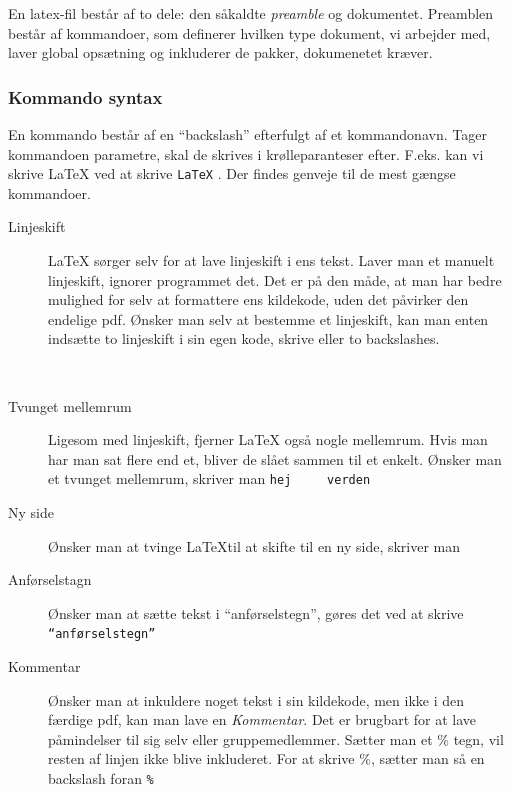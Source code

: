 \documentclass{article}
\newcommand{\tex}[1] {
  \texttt{#1}
}
\begin{document}
   En latex-fil består af to dele: den såkaldte \emph{preamble} og dokumentet.
   Preamblen består af kommandoer, som definerer hvilken type dokument, vi
   arbejder med, laver global opsætning og inkluderer de pakker, dokumenetet
   kræver.

   \subsubsection{Kommando syntax}
     En kommando består af en ``backslash'' efterfulgt af et kommandonavn.
     Tager kommandoen parametre, skal de skrives i krølleparanteser
     efter. F.eks. kan vi skrive \LaTeX{} ved at skrive \tex{\LaTeX}. Der findes
     genveje til de mest gængse kommandoer.
     \begin{description}
       \item[Linjeskift] \LaTeX{} sørger selv for at lave linjeskift i ens tekst.
         Laver man et manuelt linjeskift, ignorer programmet det. Det er på den måde, at man har
         bedre mulighed for selv at formattere ens kildekode, uden det påvirker den
         endelige pdf. Ønsker man selv at bestemme et linjeskift, kan man enten indsætte to
         linjeskift i sin egen kode, skrive \tex{\linebreak} eller to backslashes.
         \tex{\\}

       \item[Tvunget mellemrum] Ligesom med linjeskift, fjerner \LaTeX{} også
         nogle mellemrum. Hvis man har man sat flere end et, bliver de slået sammen til et enkelt.
         Ønsker man et tvunget mellemrum, skriver man \tex{hej ~~~ verden}

       \item[Ny side] Ønsker man at tvinge \LaTeX til at skifte til en ny side,
         skriver man \tex{\newpage}

       \item[Anførselstagn] Ønsker man at sætte tekst i ``anførselstegn'', gøres
         det ved at skrive \tex{``anførselstegn''}

       \item[Kommentar] Ønsker man at inkuldere noget tekst i sin kildekode, men
         ikke i den færdige pdf, kan man lave en \emph{Kommentar}. Det er brugbart
         for at lave påmindelser til sig selv eller gruppemedlemmer. Sætter man
         et \(\%\) tegn, vil resten af linjen ikke blive inkluderet. For at
         skrive \(\%\), sætter man så en backslash foran \tex{\%}



\end{description}
\end{document}
